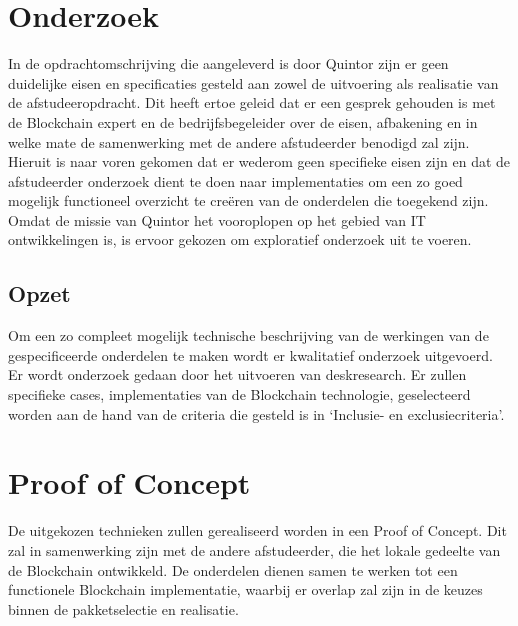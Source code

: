 \newpage
\section{Onderzoek} In de opdrachtomschrijving die aangeleverd is door Quintor zijn er geen duidelijke eisen en specificaties gesteld aan zowel de uitvoering als realisatie van de afstudeeropdracht. Dit heeft ertoe geleid dat er een gesprek gehouden is met de Blockchain expert en de bedrijfsbegeleider over de eisen, afbakening en in welke mate de samenwerking met de andere afstudeerder benodigd zal zijn. Hieruit is naar voren gekomen dat er wederom geen specifieke eisen zijn en dat de afstudeerder onderzoek dient te doen naar implementaties om een zo goed mogelijk functioneel overzicht te creëren van de onderdelen die toegekend zijn. Omdat de missie van Quintor het vooroplopen op het gebied van IT ontwikkelingen is, is ervoor gekozen om exploratief onderzoek uit te voeren.

\subsection{Opzet}

Om een zo compleet mogelijk technische beschrijving van de werkingen van de gespecificeerde onderdelen te maken wordt er kwalitatief onderzoek uitgevoerd. Er wordt onderzoek gedaan door het uitvoeren van deskresearch. Er zullen specifieke cases, implementaties van de Blockchain technologie, geselecteerd worden aan de hand van de criteria die gesteld is in ‘Inclusie- en exclusiecriteria’. 


\newpage
\section{Proof of Concept}
De uitgekozen technieken zullen gerealiseerd worden in een Proof of Concept. Dit zal in samenwerking zijn met de andere afstudeerder, die het lokale gedeelte van de Blockchain ontwikkeld. De onderdelen dienen samen te werken tot een functionele Blockchain implementatie, waarbij er overlap zal zijn in de keuzes binnen de pakketselectie en realisatie.

